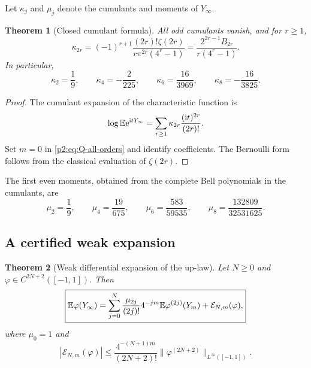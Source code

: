 \documentclass[11pt,oneside]{article}
\numberwithin{equation}{section}
\newtheorem{theorem}{Theorem}[section]
\theoremstyle{definition}
\theoremstyle{remark}
\newcommand{\e}{\mathrm e}
\newcommand{\ii}{\mathrm i}
\begin{document}
Let $\kappa_j$ and $\mu_j$ denote the cumulants and moments of $Y_\infty$.

\begin{theorem}[Closed cumulant formula]
\label{p2:thm:cumulants}
All odd cumulants vanish, and for $r\ge1$,
\begin{equation}
 \boxed{
 \kappa_{2r}
 =(-1)^{r+1}\frac{(2r)!\zeta(2r)}{r\pi^{2r}(4^r-1)}
 =\frac{2^{2r-1}B_{2r}}{r(4^r-1)}.}
 \label{p2:eq:cumulants}
\end{equation}
In particular,
\begin{equation}
 \kappa_2=\frac19,\qquad
 \kappa_4=-\frac2{225},\qquad
 \kappa_6=\frac{16}{3969},\qquad
 \kappa_8=-\frac{16}{3825}.
 \label{p2:eq:cumulants-first}
\end{equation}
\newresult
\end{theorem}

\begin{proof}
The cumulant expansion of the characteristic function is
\[
 \log\E\e^{\ii tY_\infty}
 =\sum_{r\ge1}\kappa_{2r}\frac{(\ii t)^{2r}}{(2r)!}.
\]
Set $m=0$ in \eqref{p2:eq:Q-all-orders} and identify coefficients.  The Bernoulli form follows
from the classical evaluation of $\zeta(2r)$.
\end{proof}

The first even moments, obtained from the complete Bell polynomials in the cumulants, are
\begin{equation}
 \mu_2=\frac19,\qquad
 \mu_4=\frac{19}{675},\qquad
 \mu_6=\frac{583}{59535},\qquad
 \mu_8=\frac{132809}{32531625}.
 \label{p2:eq:moments-first}
\end{equation}

\subsection{A certified weak expansion}

\begin{theorem}[Weak differential expansion of the up-law]
\label{p2:thm:weak-expansion}
Let $N\ge0$ and $\varphi\in C^{2N+2}([-1,1])$.  Then
\begin{equation}
 \boxed{
 \mathbb E\varphi(Y_\infty)
 =\sum_{j=0}^{N}\frac{\mu_{2j}}{(2j)!}4^{-jm}
   \mathbb E\varphi^{(2j)}(Y_m)+\mathcal E_{N,m}(\varphi),}
 \label{p2:eq:weak-expansion}
\end{equation}
where $\mu_0=1$ and
\begin{equation}
 \boxed{
 |\mathcal E_{N,m}(\varphi)|
 \le\frac{4^{-(N+1)m}}{(2N+2)!}
 \|\varphi^{(2N+2)}\|_{L^\infty([-1,1])}.}
 \label{p2:eq:weak-bound}
\end{equation}
\newresult
\end{theorem}
\end{document}
